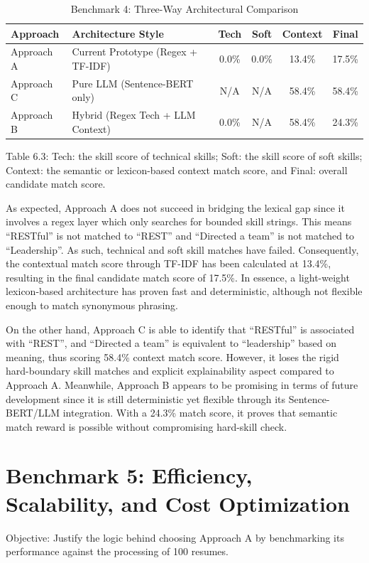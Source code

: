 \begin{table}[H]
\centering
\caption{Benchmark 4: Three-Way Architectural Comparison}
\small
\setlength{\tabcolsep}{4pt}
\renewcommand{\arraystretch}{1.2}
\begin{tabularx}{\textwidth}{>{\RaggedRight\arraybackslash}p{} >{\RaggedRight\arraybackslash}X c c c c}
\toprule
\textbf{Approach} & \textbf{Architecture Style} & \textbf{Tech} & \textbf{Soft} & \textbf{Context} & \textbf{Final}\\
\midrule
Approach A & Current Prototype (Regex + TF-IDF) & 0.0\% & 0.0\% & 13.4\% & 17.5\%\\
Approach C & Pure LLM (Sentence-BERT only) & N/A & N/A & 58.4\% & 58.4\%\\
Approach B & Hybrid (Regex Tech + LLM Context) & 0.0\% & N/A & 58.4\% & 24.3\%\\
\bottomrule
\end{tabularx}
\end{table}

Table 6.3: Tech: the skill score of technical skills; Soft: the skill score of soft skills; Context: the semantic or lexicon-based context match score, and Final: overall candidate match score.

As expected, Approach A does not succeed in bridging the lexical gap since it involves a regex layer which only searches for bounded skill strings. This means ``RESTful'' is not matched to ``REST'' and ``Directed a team'' is not matched to ``Leadership''. As such, technical and soft skill matches have failed. Consequently, the contextual match score through TF-IDF has been calculated at 13.4\%, resulting in the final candidate match score of 17.5\%. In essence, a light-weight lexicon-based architecture has proven fast and deterministic, although not flexible enough to match synonymous phrasing.

On the other hand, Approach C is able to identify that ``RESTful'' is associated with ``REST'', and ``Directed a team'' is equivalent to ``leadership'' based on meaning, thus scoring 58.4\% context match score. However, it loses the rigid hard-boundary skill matches and explicit explainability aspect compared to Approach A. Meanwhile, Approach B appears to be promising in terms of future development since it is still deterministic yet flexible through its Sentence-BERT/LLM integration. With a 24.3\% match score, it proves that semantic match reward is possible without compromising hard-skill check.

\section{Benchmark 5: Efficiency, Scalability, and Cost Optimization}
Objective: Justify the logic behind choosing Approach A by benchmarking its performance against the processing of 100 resumes.

